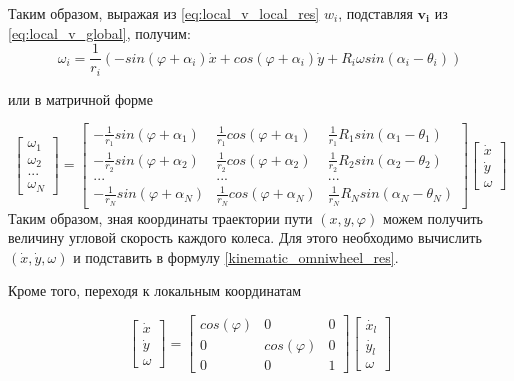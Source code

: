 \documentclass[oneside,final,14pt]{extreport}
\newcommand{\bs}{\boldsymbol}
\begin{document}
Таким образом, выражая из \ref{eq:local_v_local_res} $w_{i}$, подставляя $\bs{v_{i}}$ из \ref{eq:local_v_global}, получим:
\begin{equation}
\omega_{i}
=
\frac{1}{r_{i}}
(
-sin(\varphi +\alpha_{i})\dot{x}
+cos(\varphi +\alpha_{i})\dot{y}
+
R_{i}
\omega
sin(\alpha_{i} - \theta_{i})
)
\end{equation}

или в матричной форме 

\begin{equation}
\label{kinematic_omniwheel_res}
\begin{bmatrix}
\omega_{1} \\
\omega_{2} \\
...\\
\omega_{N}
\end{bmatrix}
=
\begin{bmatrix}
-\frac{1}{r_{1}}sin(\varphi +\alpha_{1}) &
\frac{1}{r_{1}}cos(\varphi +\alpha_{1}) &
\frac{1}{r_{1}}R_{1}sin(\alpha_{1} - \theta_{1})
\\
-\frac{1}{r_{2}}sin(\varphi +\alpha_{2}) &
\frac{1}{r_{2}}cos(\varphi +\alpha_{2}) &
\frac{1}{r_{2}}R_{2}sin(\alpha_{2} - \theta_{2})
\\
... & ... & ...
\\
-\frac{1}{r_{N}}sin(\varphi +\alpha_{N}) &
\frac{1}{r_{N}}cos(\varphi +\alpha_{N}) &
\frac{1}{r_{N}}R_{N}sin(\alpha_{N} - \theta_{N})
\end{bmatrix}
\begin{bmatrix}
\dot{x} \\
\dot{y} \\
\omega
\end{bmatrix}
\end{equation}
Таким образом, зная координаты траектории пути $(x,y,\varphi)$ можем получить величину угловой скорость каждого колеса. Для этого необходимо вычислить $(\dot{x},\dot{y},\omega)$ и подставить в формулу \ref{kinematic_omniwheel_res}.

\iffalse
Кроме того, переходя к локальным координатам

\begin{equation}
\begin{bmatrix}
\dot{x} \\
\dot{y} \\
\omega
\end{bmatrix}
=
\begin{bmatrix}
cos(\varphi) & 0 & 0 \\
0 & cos(\varphi) & 0 \\
0 & 0 & 1
\end{bmatrix}
\begin{bmatrix}
\dot{x_{l}} \\
\dot{y_{l}} \\
\omega
\end{bmatrix}
\end{equation}
\end{document}
